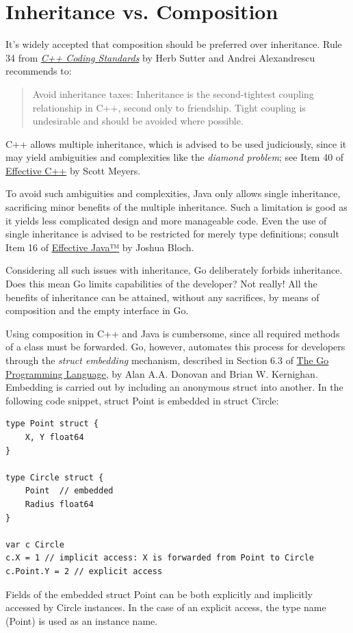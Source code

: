 \documentclass[11pt]{article}
\begin{document}
\section*{Inheritance vs. Composition}
\label{sec:orgheadline10}
It's widely accepted that composition should be preferred over inheritance. Rule 34 from \href{http://www.gotw.ca/publications/c++cs.htm}{\emph{C++ Coding Standards}} by Herb Sutter and Andrei Alexandrescu recommends to:
\begin{quote}
Avoid inheritance taxes: Inheritance is the second-tightest coupling relationship in C++, second only to friendship. Tight coupling is undesirable and should be avoided where possible.
\end{quote}
C++ allows multiple inheritance, which is advised to be used judiciously, since it may yield ambiguities and complexities like the \emph{diamond problem}; see Item 40 of \href{http://www.aristeia.com/books.html}{Effective C++} by Scott Meyers.

To avoid such ambiguities and complexities, Java only allows single inheritance, sacrificing minor benefits of the multiple inheritance. Such a limitation is good as it yields less complicated design and more manageable code. Even the use of single inheritance is advised to be restricted for merely type definitions; consult Item 16 of \href{https://www.safaribooksonline.com/library/view/effective-java-2nd/9780137150021/}{Effective Java™} by Joshua Bloch.

Considering all such issues with inheritance, Go deliberately forbids inheritance. Does this mean Go limits capabilities of the developer? Not really! All the benefits of inheritance can be attained, without any sacrifices, by means of composition and the empty interface in Go.

Using composition in C++ and Java is cumbersome, since all required methods of a class must be forwarded. Go, however, automates this process for developers through the \emph{struct embedding} mechanism, described in Section 6.3 of \href{https://dl.acm.org/citation.cfm?id=2851099}{The Go Programming Language}, by Alan A.A. Donovan and Brian W. Kernighan. Embedding is carried out by including an anonymous struct into another. In the following code snippet, struct Point is embedded in struct Circle:
\begin{verbatim}
type Point struct {
    X, Y float64
}

type Circle struct {
    Point  // embedded
    Radius float64
}

var c Circle
c.X = 1 // implicit access: X is forwarded from Point to Circle
c.Point.Y = 2 // explicit access
\end{verbatim}
Fields of the embedded struct Point can be both explicitly and implicitly accessed by Circle instances. In the case of an explicit access, the type name (Point) is used as an instance name.
\end{document}
